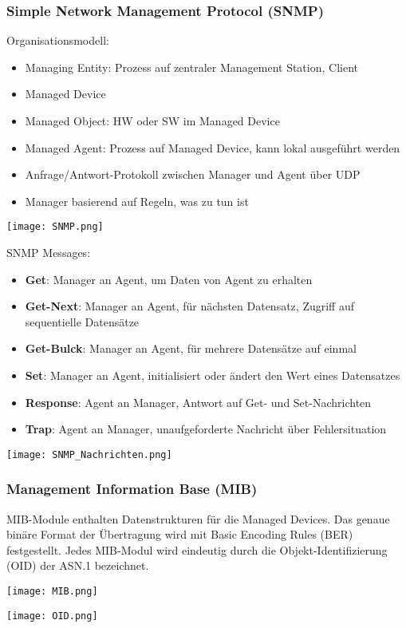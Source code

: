 		\subsubsection{Simple Network Management Protocol (SNMP)}
			Organisationsmodell: 
			\begin{itemize}
				\item Managing Entity: Prozess auf zentraler Management Station, Client
				\item Managed Device
				\item Managed Object: HW oder SW im Managed Device
				\item Managed Agent: Prozess auf Managed Device, kann lokal ausgeführt werden
				\item Anfrage/Antwort-Protokoll zwischen Manager und Agent über UDP
				\item Manager basierend auf Regeln, was zu tun ist
			\end{itemize}
			\begin{center}
				\texttt{[image: SNMP.png]}
			\end{center}
			SNMP Messages:
			\begin{itemize}
				\item \textbf{Get}: Manager an Agent, um Daten von Agent zu erhalten
				\item \textbf{Get-Next}: Manager an Agent, für nächsten Datensatz, Zugriff auf sequentielle Datensätze
				\item \textbf{Get-Bulck}: Manager an Agent, für mehrere Datensätze auf einmal
				\item \textbf{Set}: Manager an Agent, initialisiert oder ändert den Wert eines Datensatzes 
				\item \textbf{Response}: Agent an Manager, Antwort auf Get- und Set-Nachrichten
				\item \textbf{Trap}: Agent an Manager, unaufgeforderte Nachricht über Fehlersituation
			\end{itemize}
			\begin{center}
				\texttt{[image: SNMP\_Nachrichten.png]}
			\end{center}
		\subsubsection{Management Information Base (MIB)}
			MIB-Module enthalten Datenstrukturen für die Managed Devices. Das genaue binäre Format der Übertragung wird mit Basic Encoding Rules (BER) festgestellt. Jedes MIB-Modul wird eindeutig durch die Objekt-Identifizierung (OID) der ASN.1 bezeichnet.
			\begin{center}
				\texttt{[image: MIB.png]}
			\end{center}
			\begin{center}
				\texttt{[image: OID.png]}
			\end{center}
